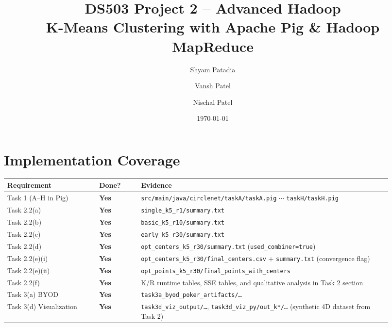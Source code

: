 \documentclass[11pt]{article}
\title{%
  \color{primary}\bfseries DS503 Project 2 -- Advanced Hadoop\\[6pt]
  \large\color{accent} K-Means Clustering with Apache Pig \& Hadoop MapReduce%
}
\author{Shyam Patadia \and Vansh Patel \and Nischal Patel}
\date{\today}
\begin{document}
\maketitle
\thispagestyle{fancy}

\section{Implementation Coverage}

\begin{longtable}{@{}p{0.22\linewidth}p{0.10\linewidth}p{0.60\linewidth}@{}}
  \rowcolor{tableheader}
  \color{white}\textbf{Requirement} &
  \color{white}\textbf{Done?} &
  \color{white}\textbf{Evidence} \\
  \midrule\endhead
  Task 1 (A--H in Pig)       & \textcolor{okgreen}{\textbf{Yes}} & \texttt{src/main/java/circlenet/taskA/taskA.pig} $\cdots$ \texttt{taskH/taskH.pig} \\
  \rowcolor{tablealt}
  Task 2.2(a)                & \textcolor{okgreen}{\textbf{Yes}} & \texttt{single\_k5\_r1/summary.txt} \\
  Task 2.2(b)                & \textcolor{okgreen}{\textbf{Yes}} & \texttt{basic\_k5\_r10/summary.txt} \\
  \rowcolor{tablealt}
  Task 2.2(c)                & \textcolor{okgreen}{\textbf{Yes}} & \texttt{early\_k5\_r30/summary.txt} \\
  Task 2.2(d)                & \textcolor{okgreen}{\textbf{Yes}} & \texttt{opt\_centers\_k5\_r30/summary.txt} (\texttt{used\_combiner=true}) \\
  \rowcolor{tablealt}
  Task 2.2(e)(i)             & \textcolor{okgreen}{\textbf{Yes}} & \texttt{opt\_centers\_k5\_r30/final\_centers.csv} + \texttt{summary.txt} (convergence flag) \\
  Task 2.2(e)(ii)            & \textcolor{okgreen}{\textbf{Yes}} & \texttt{opt\_points\_k5\_r30/final\_points\_with\_centers} \\
  \rowcolor{tablealt}
  Task 2.2(f)                & \textcolor{okgreen}{\textbf{Yes}} & K/R runtime tables, SSE tables, and qualitative analysis in Task 2 section \\
  Task 3(a) BYOD             & \textcolor{okgreen}{\textbf{Yes}} & \texttt{task3a\_byod\_poker\_artifacts/\ldots} \\
  \rowcolor{tablealt}
  Task 3(d) Visualization    & \textcolor{okgreen}{\textbf{Yes}} & \texttt{task3d\_viz\_output/\ldots}, \texttt{task3d\_viz\_py/out\_k*/\ldots} (synthetic 4D dataset from Task 2) \\
\end{longtable}
\end{document}
